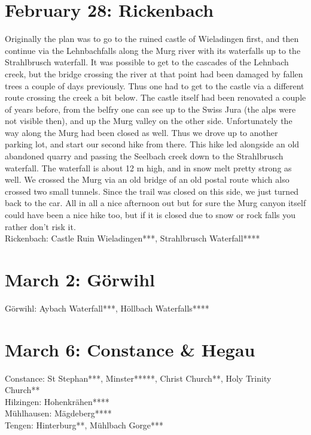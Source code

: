 \section{February 28: Rickenbach}
\label{2021:Rickenbach}

Originally the plan was to go to the ruined castle of Wieladingen first, and then continue via the Lehnbachfalls along the Murg river with its waterfalls up to the Strahlbrusch waterfall. It was possible to get to the cascades of the Lehnbach creek, but the bridge crossing the river at that point had been damaged by fallen trees a couple of days previously. Thus one had to get to the castle via a different route crossing the creek a bit below. The castle itself had been renovated a couple of years before, from the belfry one can see up to the Swiss Jura (the alps were not visible then), and up the Murg valley on the other side. Unfortunately the way along the Murg had been closed as well. Thus we drove up to another parking lot, and start our second hike from there. This hike led alongside an old abandoned quarry and passing the Seelbach creek down to the Strahlbrusch waterfall. The waterfall is about 12 m high, and in snow melt pretty strong as well. We crossed the Murg via an old bridge of an old postal route which also crossed two small tunnels. Since the trail was closed on this side, we just turned back to the car. All in all a nice afternoon out but for sure the Murg canyon itself could have been a nice hike too, but if it is closed due to snow or rock falls you rather don't risk it.\\

Rickenbach: Castle Ruin Wieladingen***, Strahlbrusch Waterfall****

\section{March 2: G\"orwihl}
\label{2021:Goerwihl}

G\"orwihl: Aybach Waterfall***, H\"ollbach Waterfalls****

\section{March 6: Constance \& Hegau}
\label{2021:Konstanz}

Constance: St Stephan***, Minster*****, Christ Church**, Holy Trinity Church**\\
Hilzingen: Hohenkr\"ahen****\\
M\"uhlhausen: M\"agdeberg****\\
Tengen: Hinterburg**, M\"uhlbach Gorge***

